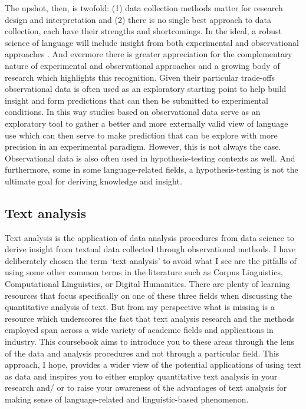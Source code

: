 \documentclass[
]{article}
\begin{document}
The upshot, then, is twofold: (1) data collection methods matter for research design and interpretation and (2) there is no single best approach to data collection, each have their strengths and shortcomings. In the ideal, a robust science of language will include insight from both experimental and observational approaches \citep{Gilquin:2009}. And evermore there is greater appreciation for the complementary nature of experimental and observational approaches and a growing body of research which highlights this recognition. Given their particular trade-offs observational data is often used as an exploratory starting point to help build insight and form predictions that can then be submitted to experimental conditions. In this way studies based on observational data serve as an exploratory tool to gather a better and more externally valid view of language use which can then serve to make prediction that can be explore with more precision in an experimental paradigm. However, this is not always the case. Observational data is also often used in hypothesis-testing contexts as well. And furthermore, some in some language-related fields, a hypothesis-testing is not the ultimate goal for deriving knowledge and insight.

\hypertarget{text-analysis}{%
\subsection{Text analysis}\label{text-analysis}}

Text analysis is the application of data analysis procedures from data science to derive insight from textual data collected through observational methods. I have deliberately chosen the term `text analysis' to avoid what I see are the pitfalls of using some other common terms in the literature such as Corpus Linguistics, Computational Linguistics, or Digital Humanities. There are plenty of learning resources that focus specifically on one of these three fields when discussing the quantitative analysis of text. But from my perspective what is missing is a resource which underscores the fact that text analysis research and the methods employed span across a wide variety of academic fields and applications in industry. This coursebook aims to introduce you to these areas through the lens of the data and analysis procedures and not through a particular field. This approach, I hope, provides a wider view of the potential applications of using text as data and inspires you to either employ quantitative text analysis in your research and/ or to raise your awareness of the advantages of text analysis for making sense of language-related and linguistic-based phenomenon.
\end{document}
